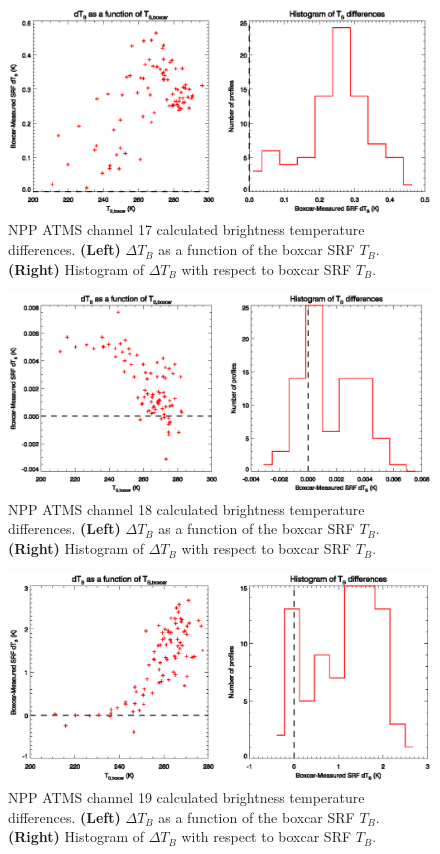\begin{figure}[H]
  \centering
  \includegraphics[scale=1]{graphics/dtb/atms_npp.ch17.TbStats.eps}
  \caption{NPP ATMS channel 17 calculated brightness temperature differences. \textbf{(Left)} $\Delta T_B$ as a function of the boxcar SRF $T_B$. \textbf{(Right)} Histogram of $\Delta T_B$ with respect to boxcar SRF $T_B$.}
  \label{fig:atms_npp.ch17.dtb}
\end{figure}

\begin{figure}[H]
  \centering
  \includegraphics[scale=1]{graphics/dtb/atms_npp.ch18.TbStats.eps}
  \caption{NPP ATMS channel 18 calculated brightness temperature differences. \textbf{(Left)} $\Delta T_B$ as a function of the boxcar SRF $T_B$. \textbf{(Right)} Histogram of $\Delta T_B$ with respect to boxcar SRF $T_B$.}
  \label{fig:atms_npp.ch18.dtb}
\end{figure}

\begin{figure}[H]
  \centering
  \includegraphics[scale=1]{graphics/dtb/atms_npp.ch19.TbStats.eps}
  \caption{NPP ATMS channel 19 calculated brightness temperature differences. \textbf{(Left)} $\Delta T_B$ as a function of the boxcar SRF $T_B$. \textbf{(Right)} Histogram of $\Delta T_B$ with respect to boxcar SRF $T_B$.}
  \label{fig:atms_npp.ch19.dtb}
\end{figure}


